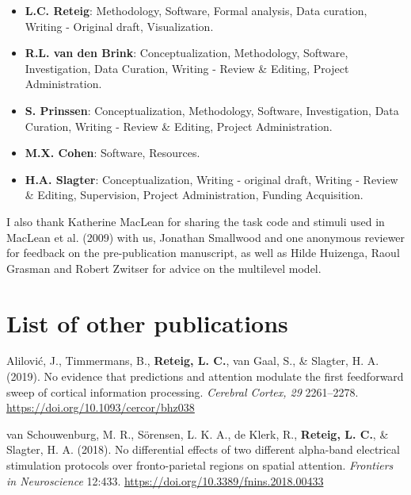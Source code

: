 \documentclass[11pt,]{memoir}
\providecommand{\tightlist}{%
  \setlength{\itemsep}{0pt}\setlength{\parskip}{0pt}}
\begin{document}
\begin{itemize}
\tightlist
\item
  \textbf{L.C. Reteig}: Methodology, Software, Formal analysis, Data curation, Writing - Original draft, Visualization.
\item
  \textbf{R.L. van den Brink}: Conceptualization, Methodology, Software, Investigation, Data Curation, Writing - Review \& Editing, Project Administration.
\item
  \textbf{S. Prinssen}: Conceptualization, Methodology, Software, Investigation, Data Curation, Writing - Review \& Editing, Project Administration.
\item
  \textbf{M.X. Cohen}: Software, Resources.
\item
  \textbf{H.A. Slagter}: Conceptualization, Writing - original draft, Writing - Review \& Editing, Supervision, Project Administration, Funding Acquisition.
\end{itemize}

\begin{list}{}{\leftmargin=1.5em\rightmargin=0pt}
\item
I also thank Katherine MacLean for sharing the task code and stimuli used in MacLean et al. (2009) with us, Jonathan Smallwood and one anonymous reviewer for feedback on the pre-publication manuscript, as well as Hilde Huizenga, Raoul Grasman and Robert Zwitser for advice on the multilevel model.
\end{list}

\hypertarget{list-of-other-publications}{%
\chapter*{List of other publications}\label{list-of-other-publications}}


Alilović, J., Timmermans, B., \textbf{Reteig, L. C.}, van Gaal, S., \& Slagter, H. A. (2019). No evidence that predictions and attention modulate the first feedforward sweep of cortical information processing. \emph{Cerebral Cortex, 29} 2261--2278. \url{https://doi.org/10.1093/cercor/bhz038}\newline

van Schouwenburg, M. R., Sörensen, L. K. A., de Klerk, R., \textbf{Reteig, L. C.}, \& Slagter, H. A. (2018). No differential effects of two different alpha-band electrical stimulation protocols over fronto-parietal regions on spatial attention. \emph{Frontiers in Neuroscience} 12:433. \url{https://doi.org/10.3389/fnins.2018.00433}\newline
\end{document}
